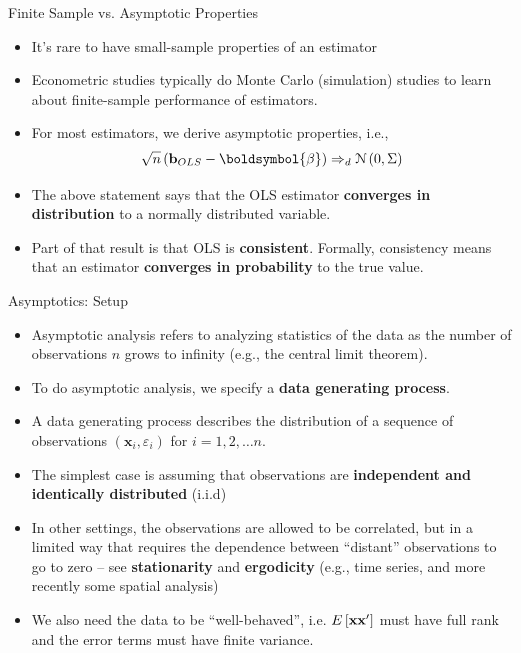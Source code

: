 \documentclass[aspectratio=169,11pt]{beamer}
\begin{document}
\begin{frame}{Finite Sample vs. Asymptotic Properties}
\begin{itemize}
	\item It's rare to have small-sample properties of an estimator

	\medskip
	\item Econometric studies typically do Monte Carlo (simulation) studies to learn
	about finite-sample performance of estimators. 

	\medskip
	\item For most estimators, we derive asymptotic properties, i.e., \[
	\sqrt{n} \left({\bf b}_{OLS} - \boldsymbol{\beta}\right) \Rightarrow_{d} \mathcal{N}\left(0, \Sigma\right)
	\]

	\item The above statement says that the OLS estimator
	 {\bf converges in distribution} to a normally distributed variable.

	\item Part of that result is that OLS is {\bf consistent}. Formally, consistency means that an estimator
	{\bf converges in probability} to the true value. 
\end{itemize}
\end{frame}



\begin{frame}{Asymptotics: Setup}
\begin{itemize}

	\item Asymptotic analysis refers to analyzing statistics of the data as the number of observations $n$
	grows to infinity (e.g., the central limit theorem).

	\item To do asymptotic analysis, we specify a {\bf data generating process}. 
	
	\item A data generating process describes the distribution of 
	 a sequence of observations $\left(\boldsymbol{x}_{i},\varepsilon_{i}\right)$ 	for $i=1,2,\dots n$. 


	\item The simplest case is assuming that observations are {\bf independent and identically distributed}
	(i.i.d)

	\item In other settings, the observations are allowed to be correlated, but in a limited way 
	that requires the dependence between ``distant'' observations to go to zero -- see {\bf stationarity}
	and {\bf ergodicity} (e.g., time series, and 	more recently some spatial analysis)

	\item We also need the data to be ``well-behaved'', i.e. $E\left[{\bf x} {\bf x}' \right]$ must have
	full rank and the error terms must have finite variance. 

\end{itemize}
\end{frame}
\end{document}
